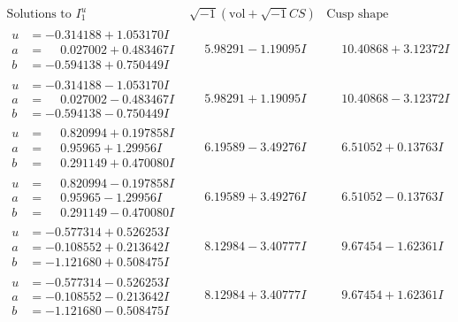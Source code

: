 \documentclass[1p]{elsarticle_modified}
\theoremstyle{definition}
\newcommand{\I}{\sqrt{-1}}
\begin{document}
$$\begin{array}{c|c|c}  
\text{Solutions to }I^u_{1}& \I (\text{vol} + \sqrt{-1}CS) & \text{Cusp shape}\\
 \hline 
\begin{aligned}
u &= -0.314188 + 1.053170 I \\
a &= \phantom{-}0.027002 + 0.483467 I \\
b &= -0.594138 + 0.750449 I\end{aligned}
 & \phantom{-}5.98291 - 1.19095 I & \phantom{-}10.40868 + 3.12372 I \\ \hline\begin{aligned}
u &= -0.314188 - 1.053170 I \\
a &= \phantom{-}0.027002 - 0.483467 I \\
b &= -0.594138 - 0.750449 I\end{aligned}
 & \phantom{-}5.98291 + 1.19095 I & \phantom{-}10.40868 - 3.12372 I \\ \hline\begin{aligned}
u &= \phantom{-}0.820994 + 0.197858 I \\
a &= \phantom{-}0.95965 + 1.29956 I \\
b &= \phantom{-}0.291149 + 0.470080 I\end{aligned}
 & \phantom{-}6.19589 - 3.49276 I & \phantom{-}6.51052 + 0.13763 I \\ \hline\begin{aligned}
u &= \phantom{-}0.820994 - 0.197858 I \\
a &= \phantom{-}0.95965 - 1.29956 I \\
b &= \phantom{-}0.291149 - 0.470080 I\end{aligned}
 & \phantom{-}6.19589 + 3.49276 I & \phantom{-}6.51052 - 0.13763 I \\ \hline\begin{aligned}
u &= -0.577314 + 0.526253 I \\
a &= -0.108552 + 0.213642 I \\
b &= -1.121680 + 0.508475 I\end{aligned}
 & \phantom{-}8.12984 - 3.40777 I & \phantom{-}9.67454 - 1.62361 I \\ \hline\begin{aligned}
u &= -0.577314 - 0.526253 I \\
a &= -0.108552 - 0.213642 I \\
b &= -1.121680 - 0.508475 I\end{aligned}
 & \phantom{-}8.12984 + 3.40777 I & \phantom{-}9.67454 + 1.62361 I \\ \hline\begin{aligned}

\end{aligned}
\end{array}$$
\end{document}
